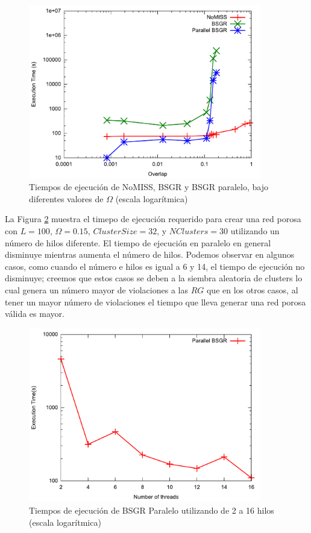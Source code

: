 \pagebreak
\begin{figure}[hbtp]
\centering
\includegraphics[width=4in]{img/variatraslape.pdf}
\caption{Tiempos de ejecución de NoMISS, BSGR y BSGR paralelo, bajo diferentes valores de $\Omega$ (escala logarítmica)}
\label{fig:timevartraslape}
\end{figure}

La Figura \ref{fig:timenuevo} muestra el timepo de ejecución requerido para crear una red porosa con $L=100$, $\Omega=0.15$, $ClusterSize=32$, y $NClusters=30$ utilizando un número de hilos diferente. El tiempo de ejecución en paralelo en general disminuye mientras aumenta el número de hilos. Podemos observar en algunos casos, como cuando el número e hilos  es igual a 6 y 14, el tiempo de ejecución no disminuye; creemos que estos casos se deben a la siembra aleatoria de clusters lo cual genera un número mayor de violaciones a las $RG$ que en los otros casos, al tener un mayor número de violaciones el tiempo que lleva generar una red porosa válida es mayor.\\
 
\begin{figure}[hbtp]
\centering
\includegraphics[width=4in]{img/tiempoPar2To16.pdf}
\caption{Tiempos de ejecución de BSGR Paralelo utilizando de 2 a 16 hilos (escala logarítmica)}
\label{fig:timenuevo}
\end{figure}

